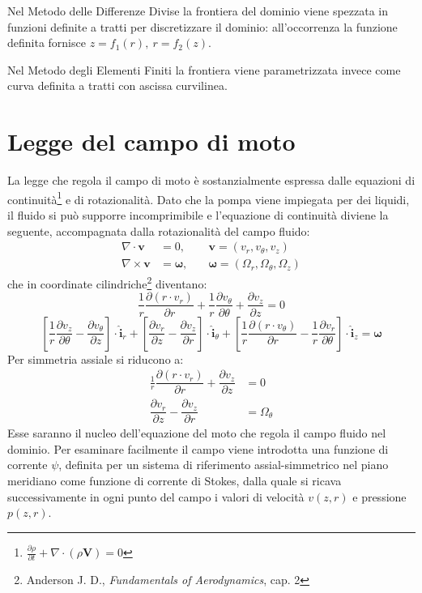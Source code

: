 \documentclass{tufte-handout}
\newcommand{\vect}[1]{\pmb{#1}}
\newcommand{\de}[2]{\dfrac{\partial #1}{\partial #2}}
\begin{document}
Nel Metodo delle Differenze Divise la frontiera del dominio viene spezzata in funzioni definite
a tratti per discretizzare il dominio: all'occorrenza la funzione definita fornisce
$z=f_1(r),\ r=f_2(z)$.

Nel Metodo degli Elementi Finiti la frontiera viene parametrizzata invece come curva
definita a tratti con ascissa curvilinea.


\newpage

\section{Legge del campo di moto}
La legge che regola il campo di moto è sostanzialmente espressa dalle equazioni di
continuità\footnote{$\frac{\partial \rho}{\partial t} + \nabla \cdot (\rho \vect{V})= 0$} e
di rotazionalità.
Dato che la pompa viene impiegata per dei liquidi, il fluido si può supporre incomprimibile
e l'equazione di continuità diviene la seguente, accompagnata dalla rotazionalità del campo fluido:
\begin{align}
    \nabla \cdot \vect{v} &= 0,
    \quad
    &\vect{v} = (v_{r}, v_{\theta}, v_{z})\\
    \nabla \times \vect{v} &= \vect{\omega},
    \quad
    &\vect{\omega} = (\Omega_r, \Omega_\theta, \Omega_z)
\end{align}
che in coordinate cilindriche\footnote{Anderson J. D., \emph{Fundamentals of Aerodynamics}, cap. 2} diventano:
\begin{equation*}
    \frac{1}{r}
    \de{(r \cdot v_r)}{r}
    +
    \frac{1}{r}
    \de{v_\theta}{\theta}
    +
    \de{v_z}{z}
    = 0
\end{equation*}
\begin{equation*}
    \left[
        \frac{1}{r}
        \de{v_z}{\theta}
        -\de{v_\theta}{z}
    \right]
    \cdot
    \vect{\hat{i}}_r
    +
    \left[
        \de{v_r}{z}-\de{v_z}{r}
    \right]
    \cdot
    \vect{\hat{i}}_{\theta}
    +
    \left[
        \frac{1}{r}
        \de{(r \cdot v_\theta)}{r}
        -
        \frac{1}{r}
        \de{v_r}{\theta}
    \right]
    \cdot
    \vect{\hat{i}}_z
    =
    \vect{\omega}
\end{equation*}
Per simmetria assiale si riducono a:
\begin{align}
    \frac{1}{r}
    \de{(r \cdot v_r)}{r}
    +
    \de{v_z}{z}
    &= 0 \label{eq:contass}
    \\
    \de{v_r}{z}
    -
    \de{v_z}{r}
    &=\Omega_\theta \label{eq:rotass}
\end{align}
Esse saranno il nucleo dell'equazione del moto che regola il campo fluido nel dominio. Per esaminare facilmente
il campo viene introdotta una funzione di corrente $\psi$, definita per un sistema di riferimento
assial-simmetrico nel piano meridiano come funzione di corrente di Stokes, dalla quale si ricava successivamente
in ogni punto del campo i valori di velocità $v(z,r)$ e pressione $p(z,r)$.
\end{document}

